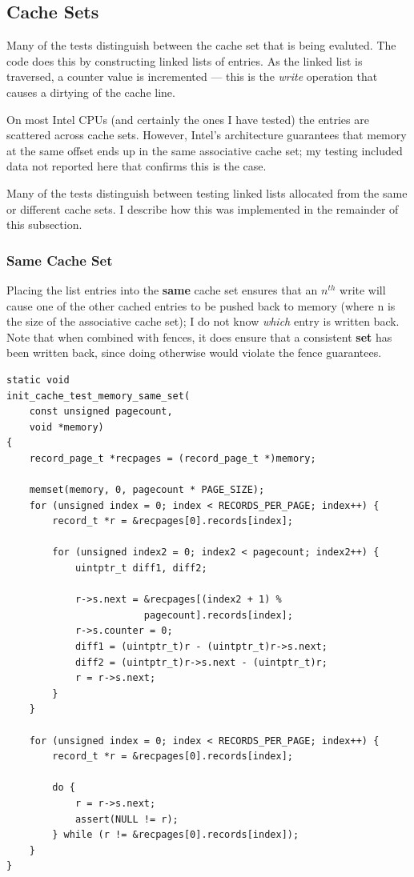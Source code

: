 \subsection{Cache Sets}\label{micro:sec:cachesets}

Many of the tests distinguish between the cache set that is
being evaluted.  The code does this by constructing linked
lists of entries. As the linked list is traversed, a counter
value is incremented --- this is the \textit{write} operation
that causes a dirtying of the cache line.

On most Intel CPUs (and certainly the ones I have tested) the
entries are scattered across cache sets.  However, Intel's
architecture guarantees that memory at the same offset ends up in the same associative cache set; my testing included data not reported here that confirms this is the case.

Many of the tests distinguish between testing linked lists allocated from the same or different cache sets.  I describe how this was implemented in the remainder of this subsection.

\subsubsection{Same Cache Set}

Placing the list entries into the \textbf{same} cache set
ensures that an $n^{th}$ write will cause one of the other cached
entries to be pushed back to memory (where n is the size of the 
associative cache set); I do not know \textit{which}
entry is written back. Note that when combined with fences, it does ensure that a consistent \textbf{set} has been written
back, since doing otherwise would violate the fence guarantees.

\begin{verbatim}
static void 
init_cache_test_memory_same_set(
    const unsigned pagecount, 
    void *memory)
{
    record_page_t *recpages = (record_page_t *)memory;

    memset(memory, 0, pagecount * PAGE_SIZE);
    for (unsigned index = 0; index < RECORDS_PER_PAGE; index++) {
        record_t *r = &recpages[0].records[index];

        for (unsigned index2 = 0; index2 < pagecount; index2++) {
            uintptr_t diff1, diff2;

            r->s.next = &recpages[(index2 + 1) % 
                        pagecount].records[index];
            r->s.counter = 0;
            diff1 = (uintptr_t)r - (uintptr_t)r->s.next;
            diff2 = (uintptr_t)r->s.next - (uintptr_t)r;
            r = r->s.next; 
        }
    }
    
    for (unsigned index = 0; index < RECORDS_PER_PAGE; index++) {
        record_t *r = &recpages[0].records[index];

        do {
            r = r->s.next;
            assert(NULL != r);
        } while (r != &recpages[0].records[index]);
    }
}  
\end{verbatim}

